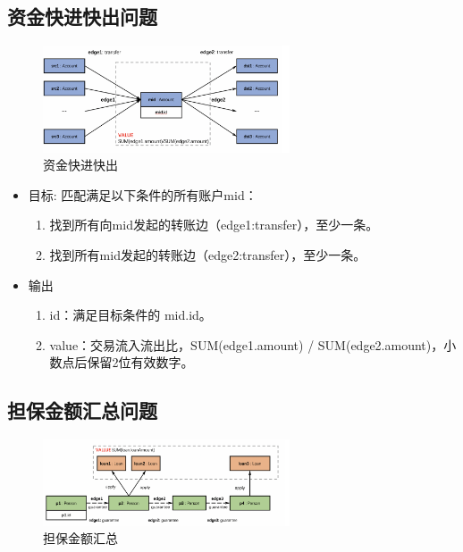 \subsection{资金快进快出问题} \label{pro2}
\begin{figure}[H]
  \begin{center}
    \includegraphics[width=0.65\textwidth]{./figures/蚂蚁改6-546936.png}
  \end{center}
  \caption{资金快进快出}
\end{figure}

\begin{itemize}
  \item 目标: 匹配满足以下条件的所有账户mid：
    \begin{enumerate}
      \item 找到所有向mid发起的转账边（edge1:transfer），至少一条。
      \item 找到所有mid发起的转账边（edge2:transfer），至少一条。
    \end{enumerate}
  \item 输出
    \begin{enumerate}
      \item id：满足目标条件的 mid.id。
      \item value：交易流入流出比，SUM(edge1.amount) / SUM(edge2.amount)，小数点后保留2位有效数字。
    \end{enumerate}
\end{itemize}

\subsection{担保金额汇总问题} \label{pro3}
\begin{figure}[H]
  \begin{center}
    \includegraphics[width=0.65\textwidth]{./figures/蚂蚁改7-686551.png}
  \end{center}
  \caption{担保金额汇总}
\end{figure}

